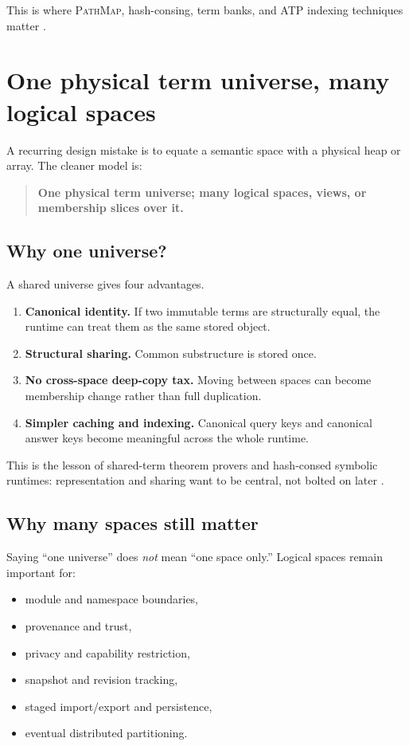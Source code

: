 \documentclass[11pt]{article}
\newcommand{\PathMap}{\textsc{PathMap}}
\begin{document}
This is where \PathMap, hash-consing, term banks, and ATP indexing techniques matter \cite{pathmap_docs,e_technology,filliatre_hashcons,cuoq_doligez}.

\section{One physical term universe, many logical spaces}
A recurring design mistake is to equate a semantic space with a physical heap or array. The cleaner model is:
\begin{quote}
\textbf{One physical term universe; many logical spaces, views, or membership slices over it.}
\end{quote}

\subsection{Why one universe?}
A shared universe gives four advantages.
\begin{enumerate}
    \item \textbf{Canonical identity.} If two immutable terms are structurally equal, the runtime can treat them as the same stored object.
    \item \textbf{Structural sharing.} Common substructure is stored once.
    \item \textbf{No cross-space deep-copy tax.} Moving between spaces can become membership change rather than full duplication.
    \item \textbf{Simpler caching and indexing.} Canonical query keys and canonical answer keys become meaningful across the whole runtime.
\end{enumerate}

This is the lesson of shared-term theorem provers and hash-consed symbolic runtimes: representation and sharing want to be central, not bolted on later \cite{e_technology,filliatre_hashcons,cuoq_doligez}.

\subsection{Why many spaces still matter}
Saying ``one universe'' does \emph{not} mean ``one space only.'' Logical spaces remain important for:
\begin{itemize}
    \item module and namespace boundaries,
    \item provenance and trust,
    \item privacy and capability restriction,
    \item snapshot and revision tracking,
    \item staged import/export and persistence,
    \item eventual distributed partitioning.
\end{itemize}
\end{document}
